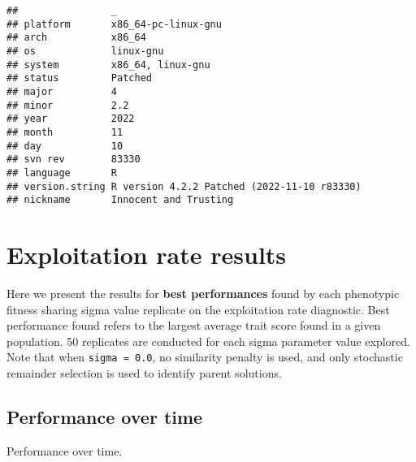 \documentclass[]{book}
\newenvironment{Shaded}{\begin{snugshade}}{\end{snugshade}}
\newcommand{\DataTypeTok}[1]{\textcolor[rgb]{0.13,0.29,0.53}{#1}}
\newcommand{\KeywordTok}[1]{\textcolor[rgb]{0.13,0.29,0.53}{\textbf{#1}}}
\newcommand{\NormalTok}[1]{#1}
\newcommand{\OperatorTok}[1]{\textcolor[rgb]{0.81,0.36,0.00}{\textbf{#1}}}
\newcommand{\StringTok}[1]{\textcolor[rgb]{0.31,0.60,0.02}{#1}}
\begin{document}
\begin{verbatim}
##                _                                          
## platform       x86_64-pc-linux-gnu                        
## arch           x86_64                                     
## os             linux-gnu                                  
## system         x86_64, linux-gnu                          
## status         Patched                                    
## major          4                                          
## minor          2.2                                        
## year           2022                                       
## month          11                                         
## day            10                                         
## svn rev        83330                                      
## language       R                                          
## version.string R version 4.2.2 Patched (2022-11-10 r83330)
## nickname       Innocent and Trusting
\end{verbatim}

\hypertarget{exploitation-rate-results-4}{%
\section{Exploitation rate results}\label{exploitation-rate-results-4}}

Here we present the results for \textbf{best performances} found by each phenotypic fitness sharing sigma value replicate on the exploitation rate diagnostic.
Best performance found refers to the largest average trait score found in a given population.
50 replicates are conducted for each sigma parameter value explored.
Note that when \texttt{sigma\ =\ 0.0}, no similarity penalty is used, and only stochastic remainder selection is used to identify parent solutions.

\hypertarget{performance-over-time-14}{%
\subsection{Performance over time}\label{performance-over-time-14}}

Performance over time.

\begin{Shaded}
\end{Shaded}
\end{document}
